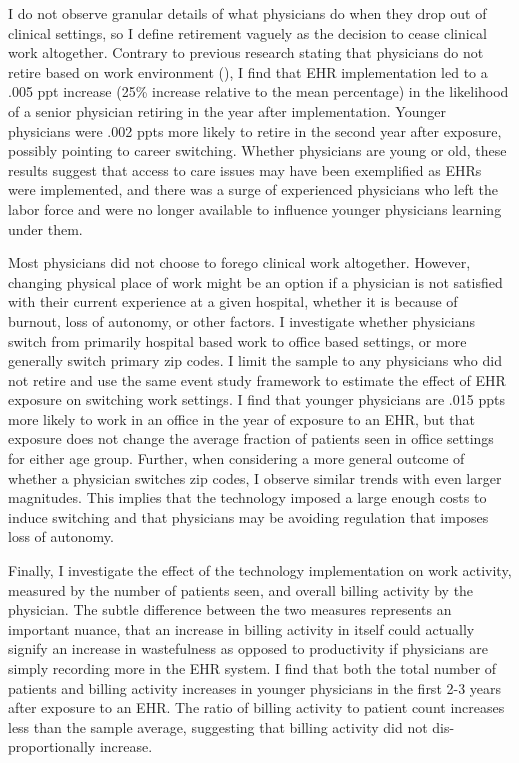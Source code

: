 \documentclass[11pt]{article}
\begin{document}
I do not observe granular details of what physicians do when they drop out of clinical settings, so I define retirement vaguely as the decision to cease clinical work altogether. Contrary to previous research stating that physicians do not retire based on work environment (\cite{Bahrami2002}), I find that EHR implementation led to a .005 ppt increase (25\% increase relative to the mean percentage) in the likelihood of a senior physician retiring in the year after implementation. Younger physicians were .002 ppts more likely to retire in the second year after exposure, possibly pointing to career switching. Whether physicians are young or old, these results suggest that access to care issues may have been exemplified as EHRs were implemented, and there was a surge of experienced physicians who left the labor force and were no longer available to influence younger physicians learning under them.

Most physicians did not choose to forego clinical work altogether. However, changing physical place of work might be an option if a physician is not satisfied with their current experience at a given hospital, whether it is because of burnout, loss of autonomy, or other factors. I investigate whether physicians switch from primarily hospital based work to office based settings, or more generally switch primary zip codes. I limit the sample to any physicians who did not retire and use the same event study framework to estimate the effect of EHR exposure on switching work settings. I find that younger physicians are .015 ppts more likely to work in an office in the year of exposure to an EHR, but that exposure does not change the average fraction of patients seen in office settings for either age group. Further, when considering a more general outcome of whether a physician switches zip codes, I observe similar trends with even larger magnitudes. This implies that the technology imposed a large enough costs to induce switching and that physicians may be avoiding regulation that imposes loss of autonomy.

Finally, I investigate the effect of the technology implementation on work activity, measured by the number of patients seen, and overall billing activity by the physician. The subtle difference between the two measures represents an important nuance, that an increase in billing activity in itself could actually signify an increase in wastefulness as opposed to productivity if physicians are simply recording more in the EHR system. I find that both the total number of patients and billing activity increases in younger physicians in the first 2-3 years after exposure to an EHR. The ratio of billing activity to patient count increases less than the sample average, suggesting that billing activity did not dis-proportionally increase. 
\end{document}
